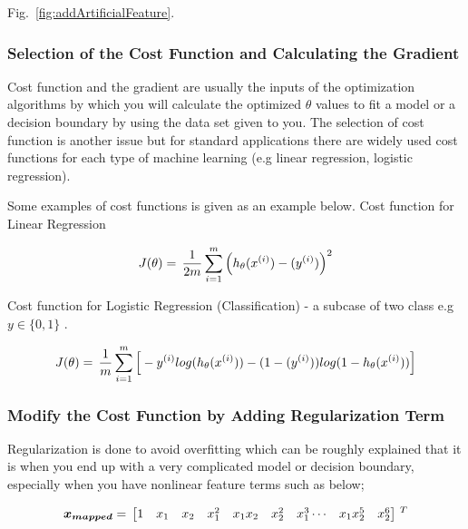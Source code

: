 Fig.~\ref{fig:addArtificialFeature}. 

\subsubsection{Selection of the Cost Function and Calculating the Gradient }

Cost function and the gradient are usually the inputs of the optimization 
algorithms by which you will calculate the optimized $\theta$ values 
to fit a model or a decision boundary by using the data set given to you. 
The selection of cost function is another issue but for standard applications 
there are widely used cost functions for each type of machine learning 
(e.g linear regression, logistic regression). 

Some examples of cost functions is given as an example below. 
Cost function for Linear Regression 

\begin{equation}{\label{eqn:costFuncLinearRegression}}
J(\theta)
=\,
\frac{1}{2m} \sum\limits_{i=1}^{m} \Big(h_\theta(x^{(i)}) - (y^{(i)})\Big)^2  
\end{equation} 

Cost function for Logistic Regression (Classification) - a subcase of two class e.g $y \in \{0,1\}$ . 

\begin{equation}{\label{eqn:costFuncLogisticRegression}}
J(\theta)
=\,
\frac{1}{m} \sum\limits_{i=1}^{m} \Big[-y^{(i)}log(h_\theta(x^{(i)})) - (1-(y^{(i)}))log(1-h_\theta(x^{(i)}))\Big]
\end{equation} 

\subsubsection{Modify the Cost Function by Adding Regularization Term}

Regularization is done to avoid overfitting which can be 
roughly explained that it is when you end up with a very complicated 
model or decision boundary, especially when you have nonlinear feature 
terms such as below;

\begin{equation}{\label{eqn:featureMapping2}}
\bm{x_{mapped}}
=\,
\begin{bmatrix}
1 & x_1 & x_2 & x_1^2 & x_1x_2 & x_2^2 & x_1^3 \cdots & x_1x_2^5 & x_2^6 
\end{bmatrix}
\,^ T
\end{equation} 

